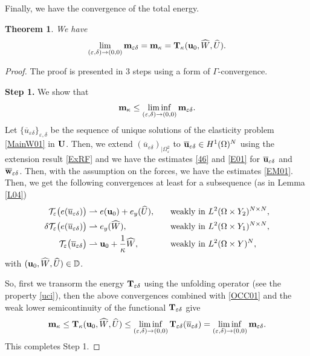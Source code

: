 \documentclass[11pt,a4paper]{article}
\numberwithin{equation}{section}
\def\wo{\overline}
\def\O{\Omega}
\def\d{\delta}
\def\e{\varepsilon}
\def\Te{{\cal T}_\varepsilon}
\def\D{{\mathbb{D}}}
\def\ed{{\varepsilon\delta}}
\def\wh{\widehat }
\def\X{\times }
\def\Gm{{\bf m}}
\def\Gu{{\bf u}}
\def\Gw{{\bf w}}
\def\GT{{\bf T}}
\def\GU{{\bf U}}
\newtheorem{theorem}{Theorem}[section]
\begin{document}
Finally, we have the convergence of the total energy.
\begin{theorem}\label{ENH01}
	We have 
	\begin{equation}\label{ECM01}
		\lim_{(\e,\d)\to(0,0)}\Gm_\ed=\Gm_\kappa=\GT_\kappa(\Gu_0,\wh W,\wh U).
	\end{equation}
\end{theorem}
\begin{proof}
	The proof is presented in $3$ steps using a form of $\Gamma$-convergence.
	
	{\bf Step 1.} We show that
	\begin{equation}
		\Gm_\kappa\leq \liminf_{(\e,\d)\to(0,0)}\Gm_\ed.
	\end{equation}
	Let $\{\wo u_\ed\}_{\e,\d}$ be the sequence of unique solutions of the elasticity problem \eqref{MainW01} in $\GU$. Then, we extend $(\wo u_\ed)_{|\O^2_\e}$ to $\wo\Gu_\ed\in H^1(\O)^N$ using the extension result \eqref{ExRF} and we have the estimates \eqref{46} and \eqref{E01} for $\wo\Gu_\ed$ and $\wo\Gw_\ed$. Then, with the assumption on the forces, we have the estimates \eqref{EM01}. Then, we get the following convergences at least for a subsequence (as in Lemma \ref{L04})
	\begin{equation}\label{II02}
		\begin{aligned}
			\Te\big(e(\wo{u}_\ed)\big) &\rightharpoonup e(\Gu_0)+e_y(\wh U),\quad&&\text{weakly in $L^2(\O\X Y_2)^{N\X N}$},\\
			\d\Te\big(e(\wo u_\ed)\big)& \rightharpoonup e_y(\wh W),\quad&&\text{weakly in $L^2(\O\X Y_1)^{N\X N}$},\\
			\Te\big(\wo u_\ed\big)& \rightharpoonup \Gu_0+{1\over \kappa}\wh W,\quad&&\text{weakly in $L^2(\O\X Y)^{N}$},
		\end{aligned}
	\end{equation}
	with $(\Gu_0,\wh W,\wh U)\in \D$.
	
	So, first we transorm the energy $\GT_\ed$ using the unfolding operator (see the property \eqref{uci}), then the above convergences combined with \eqref{OCC01} and the weak lower semicontinuity of the functional $\GT_\ed$ give
	$$\Gm_\kappa\leq \GT_\kappa(\Gu_0,\wh W,\wh U)\leq \liminf_{(\e,\d)\to(0,0)}\GT_\ed(\wo u_\ed)=\liminf_{(\e,\d)\to(0,0)}\Gm_\ed.$$
	This completes Step 1.
	

\end{proof}
\end{document}

